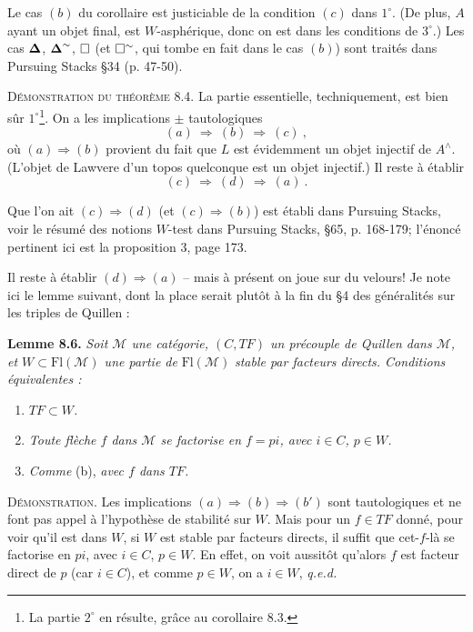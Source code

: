 Le cas $(b)$ du corollaire est justiciable de la condition $(c)$ dans $1^\circ$. (De plus, $A$ ayant un objet final, est $W$-asphérique, donc on est dans les conditions de $3^\circ$.) Les cas $\boldsymbol{\Delta}$, $\boldsymbol{\Delta}^{\sim}$, $\square$ (et $\square^{\sim}$, qui tombe en fait dans le cas $(b)$) sont traités dans Pursuing Stacks \S34 (p. 47-50).

\textsc{Démonstration du théorème} 8.4. La partie essentielle, techniquement, est bien sûr $1^\circ$\footnote[41]{La partie $2^\circ$ en résulte, grâce au corollaire 8.3.}. On a les implications $\pm$ tautologiques
\[
(a) \ \Longrightarrow\ (b) \ \Longrightarrow\ (c)\ ,
\]
où $(a) \Longrightarrow (b)$ provient du fait que $L$ est évidemment un objet injectif de $A^\wedge$. (L'objet de Lawvere d'un topos quelconque est un objet injectif.) Il reste à établir
\[
(c) \ \Longrightarrow\ (d) \ \Longrightarrow\ (a)\ .
\]


Que l'on ait $(c) \Longrightarrow (d)$ (et $(c) \Longrightarrow (b)$) est établi dans Pursuing Stacks, voir le résumé des notions $W$-test dans Pursuing Stacks, \S65, p. 168-179; l'énoncé pertinent ici est la proposition 3, page 173.

Il reste à établir $(d) \Longrightarrow (a)$ – mais à présent on joue sur du velours! Je note ici le lemme suivant, dont la place serait plutôt à la fin du \S4 des généralités sur les triples de Quillen :


\textbf{Lemme 8.6.} \textit{Soit $\mathcal{M}$ une catégorie, $(C,TF)$ un précouple de Quillen dans $\mathcal{M}$, et $W \subset \mathrm{Fl}(\mathcal{M})$ une partie de} $\mathrm{Fl}(\mathcal{M})$ \textit{stable par facteurs directs. Conditions équivalentes :}
\begin{enumerate}[leftmargin=2.5em]
\item[a)] \textit{$TF \subset W$.}
\item[b)] \textit{Toute flèche $f$ dans $\mathcal{M}$ se factorise en $f = pi$, avec $i \in C$, $p \in W$.}
\item[b$'$)] \textit{Comme} (b), \textit{avec $f$ dans $TF$.}
\end{enumerate}

\textsc{Démonstration}. Les implications $(a) \Longrightarrow (b) \Longrightarrow (b')$ sont tautologiques et ne font pas appel à l'hypothèse de stabilité sur $W$. Mais pour un $f \in TF$ donné, pour voir qu'il est dans $W$, si $W$ est stable par facteurs directs, il suffit que cet-$f$-là se factorise en $pi$, avec $i \in C$, $p \in W$. En effet, on voit aussitôt qu'alors $f$ est facteur direct de $p$ (car $i \in C$), et comme $p \in W$, on a $i \in W$, \quad \textit{q.e.d.} %

